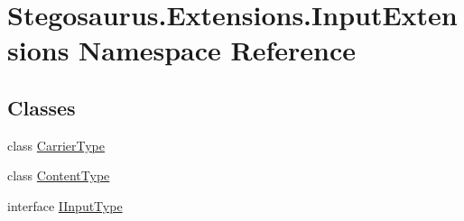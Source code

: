 \hypertarget{namespace_stegosaurus_1_1_extensions_1_1_input_extensions}{}\section{Stegosaurus.\+Extensions.\+Input\+Extensions Namespace Reference}
\label{namespace_stegosaurus_1_1_extensions_1_1_input_extensions}
\subsection*{Classes}
\begin{DoxyCompactItemize}
\item 
class \hyperlink{class_stegosaurus_1_1_extensions_1_1_input_extensions_1_1_carrier_type}{Carrier\+Type}
\item 
class \hyperlink{class_stegosaurus_1_1_extensions_1_1_input_extensions_1_1_content_type}{Content\+Type}
\item 
interface \hyperlink{interface_stegosaurus_1_1_extensions_1_1_input_extensions_1_1_i_input_type}{I\+Input\+Type}
\end{DoxyCompactItemize}
